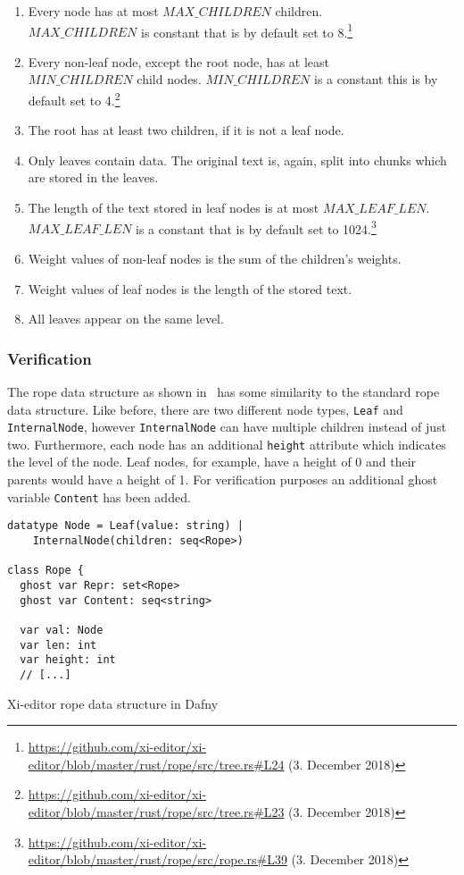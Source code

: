 \begin{enumerate}
  \item Every node has at most $MAX\_CHILDREN$ children. \\ $MAX\_CHILDREN$ is constant that is by default set to 8.\footnote{\url{https://github.com/xi-editor/xi-editor/blob/master/rust/rope/src/tree.rs\#L24} (3. December 2018)}
  \item Every non-leaf node, except the root node, has at least \\ $MIN\_CHILDREN$ child nodes. $MIN\_CHILDREN$ is a constant this is by default set to 4.\footnote{\url{https://github.com/xi-editor/xi-editor/blob/master/rust/rope/src/tree.rs\#L23} (3. December 2018)}
  \item The root has at least two children, if it is not a leaf node.
  \item Only leaves contain data. The original text is, again, split into chunks which are stored in the leaves.
  \item The length of the text stored in leaf nodes is at most $MAX\_LEAF\_LEN$. $MAX\_LEAF\_LEN$ is a constant that is by default set to 1024.\footnote{\url{https://github.com/xi-editor/xi-editor/blob/master/rust/rope/src/rope.rs\#L39} (3. December 2018)}
  \item Weight values of non-leaf nodes is the sum of the children's weights.
  \item Weight values of leaf nodes is the length of the stored text.
  \item All leaves appear on the same level.
\end{enumerate}

\subsubsection{Verification}

The rope data structure as shown in~ has some similarity to the standard rope data structure.
Like before, there are two different node types, \texttt{Leaf} and \texttt{InternalNode}, however \texttt{InternalNode} can have multiple children instead of just two.
Furthermore, each node has an additional \texttt{height} attribute which indicates the level of the node.
Leaf nodes, for example, have a height of 0 and their parents would have a height of 1.
For verification purposes an additional ghost variable \texttt{Content} has been added.

\begin{listing}[h!]
\begin{verbatim}
datatype Node = Leaf(value: string) |
    InternalNode(children: seq<Rope>)

class Rope {
  ghost var Repr: set<Rope>
  ghost var Content: seq<string>

  var val: Node
  var len: int
  var height: int
  // [...]
\end{verbatim}
    \caption{Xi-editor rope data structure in Dafny}
    \label{lst:xi-rope}
\end{listing}

